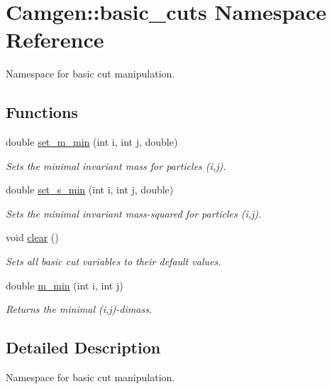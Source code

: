 \hypertarget{a00850}{\section{Camgen\-:\-:basic\-\_\-cuts Namespace Reference}
\label{a00850}
}


Namespace for basic cut manipulation.  


\subsection*{Functions}
\begin{DoxyCompactItemize}
\item 
double \hyperlink{a00850_a2c6ac3377c1cfcca9c07fd789eb6d8a1}{set\-\_\-m\-\_\-min} (int i, int j, double)
\begin{DoxyCompactList}\small\item\em Sets the minimal invariant mass for particles (i,j). \end{DoxyCompactList}\item 
double \hyperlink{a00850_a06768fc1ac5f34d8657a1b1dfd0a104d}{set\-\_\-s\-\_\-min} (int i, int j, double)
\begin{DoxyCompactList}\small\item\em Sets the minimal invariant mass-\/squared for particles (i,j). \end{DoxyCompactList}\item 
\hypertarget{a00850_a7a908084900d0916765a80c48cbde675}{void \hyperlink{a00850_a7a908084900d0916765a80c48cbde675}{clear} ()}\label{a00850_a7a908084900d0916765a80c48cbde675}

\begin{DoxyCompactList}\small\item\em Sets all basic cut variables to their default values. \end{DoxyCompactList}\item 
\hypertarget{a00850_ad9a932146d48ae43b7f29776cd917921}{double \hyperlink{a00850_ad9a932146d48ae43b7f29776cd917921}{m\-\_\-min} (int i, int j)}\label{a00850_ad9a932146d48ae43b7f29776cd917921}

\begin{DoxyCompactList}\small\item\em Returns the minimal (i,j)-\/dimass. \end{DoxyCompactList}\end{DoxyCompactItemize}


\subsection{Detailed Description}
Namespace for basic cut manipulation. 

